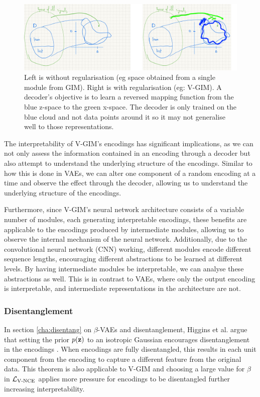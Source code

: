 		\begin{figure} %
			\centering
			\includegraphics[width=0.7\linewidth]{"no regularisation"}
			\caption{Left is without regularisation (eg space obtained from a single module from GIM). Right is with regularisation (eg: V-GIM). A decoder's objective is to learn a reversed mapping function from the blue z-space to the green x-space. The decoder is only trained on the blue cloud and not data points around it so it may not generalise well to those representations. }
			\label{fig:no-regularisation}
		\end{figure}
	
		The interpretability of V-GIM's encodings has significant implications, as we can not only assess the information contained in an encoding through a decoder but also attempt to understand the underlying structure of the encodings. Similar to how this is done in VAEs, we can alter one component of a random encoding at a time and observe the effect through the decoder, allowing us to understand the underlying structure of the encodings.
		
		Furthermore, since V-GIM's neural network architecture consists of a variable number of modules, each generating interpretable encodings, these benefits are applicable to the encodings produced by intermediate modules, allowing us to observe the internal mechanism of the neural network. Additionally, due to the convolutional neural network (CNN) working, different modules encode different sequence lengths, encouraging different abstractions to be learned at different levels. By having intermediate modules be interpretable, we can analyse these abstractions as well. This is in contrast to VAEs, where only the output encoding is interpretable, and intermediate representations in the architecture are not.

						
	\subsubsection{Disentanglement}
		In section \ref{cha:disentang} on $\beta$-VAEs and disentanglement, Higgins et al. argue that setting the prior $p(\mathbf{z})$ to an isotropic Gaussian encourages disentanglement in the encodings \cite{higginsBetaVAELearningBasic2022}. When encodings are fully disentangled, this results in each unit component from the encoding to capture a different feature from the original data. This theorem is also applicable to V-GIM and choosing a large value for $\beta$ in $\mathcal{L}_{\text{V-NCE}}$ applies more pressure for encodings to be disentangled further increasing interpretability.
		
